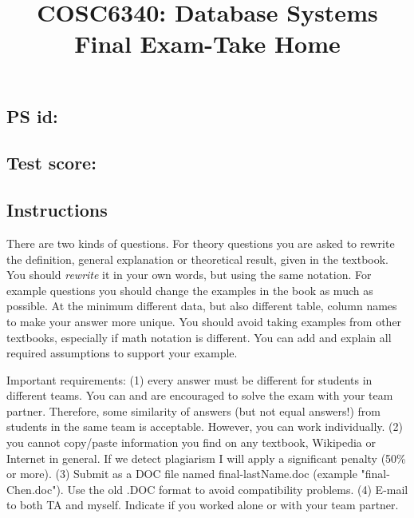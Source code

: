 

\title{COSC6340: Database Systems\\
Final Exam-Take Home
}

\author{}
\date{}




\pagestyle{plain}
\let\thepage\relax  %

\maketitle

\subsection*{PS id:}

\subsection*{Test score:}


\subsection*{Instructions}

There are two kinds of questions.
For theory questions you are asked to rewrite the definition, general explanation or
theoretical result, given in the textbook. 
You should {\em rewrite} it in your own words, but using the same notation.
For example questions you should change the examples in the book as much as possible.
At the minimum different data, but also different table, column names to make
your answer more unique.
You should avoid taking examples from other textbooks, especially if math notation is different.
You can add and explain all required assumptions to support your example.

Important requirements:
(1) every answer must be different for students in different teams.
You can and are encouraged to solve the exam with your team partner.
Therefore, some similarity of answers (but not equal answers!) 
from students in the same team is acceptable.
However, you can work individually. 
(2) you cannot copy/paste information you find on any textbook, Wikipedia or Internet in general.
If we detect plagiarism I will apply a significant penalty (50\% or more).
(3) Submit as a DOC file named final-lastName.doc (example "final-Chen.doc").
Use the old .DOC format to avoid compatibility problems.
(4) E-mail to both TA and myself. Indicate if you worked alone or with your team partner.

